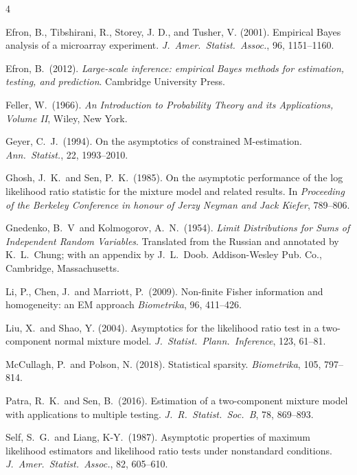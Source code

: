 \documentclass[11pt]{article}
\theoremstyle{definition}
\begin{document}
\begin{thebibliography}{4}
	
	Efron, B., Tibshirani, R., Storey, J. D., and Tusher, V. (2001). Empirical Bayes analysis of a microarray experiment.
	\emph{J.~Amer.~Statist.~Assoc.}, 96, 1151--1160.	
	
	Efron, B.~(2012). \emph{Large-scale inference: empirical Bayes methods for estimation, testing, and prediction}. Cambridge University Press.
	
	Feller, W.~(1966). \emph{An Introduction to Probability Theory and its Applications, Volume II}, Wiley, New York.
	
	Geyer, C.~J.~(1994).
	On the asymptotics of constrained M-estimation.	 \textit{Ann.~Statist.}, 22, 1993--2010.
	
	Ghosh, J.~K.~and Sen, P.~K.~(1985). On the asymptotic performance of the log likelihood ratio statistic for the mixture model and related results.
	In \emph{Proceeding of the Berkeley Conference in honour of Jerzy Neyman and Jack Kiefer}, 789--806.
	
	Gnedenko, B.~V~and Kolmogorov, A.~N.~(1954).
	\textit{Limit Distributions for Sums of Independent Random Variables}. Translated from the Russian and annotated by K.~L.~Chung; with an appendix by J.~L.~Doob. Addison-Wesley Pub. Co., Cambridge, Massachusetts.
	
	Li, P., Chen, J.~and Marriott, P.~(2009).
	Non-finite Fisher information and homogeneity: an EM approach
	\textit{Biometrika}, 96, 411--426.
	
	Liu, X.~and Shao, Y. (2004). Asymptotics for the likelihood ratio test in a two-component normal mixture model.
	\emph{J.~Statist.~Plann.~Inference}, 123, 61--81.
	
	McCullagh, P.~and Polson, N. (2018). Statistical sparsity.
	\emph{Biometrika}, 105, 797--814.
	
	Patra, R.~K.~and Sen, B.~(2016).
	Estimation of a two-component mixture model with applications to multiple testing.
	\textit{J.~R.~Statist.~Soc.~B}, 78, 869--893.
	
	Self, S.~G.~and Liang, K-Y.~(1987).
	Asymptotic properties of maximum likelihood estimators and likelihood ratio tests under nonstandard conditions.
	\textit{J.~Amer.~Statist.~Assoc.}, 82, 605--610.
	

\end{thebibliography}
\end{document}
